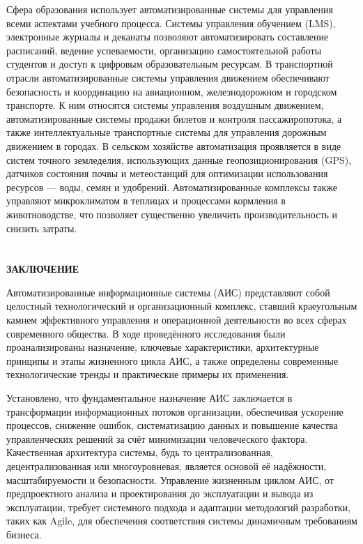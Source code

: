 \documentclass{SibFU-docs}
\begin{document}
Сфера образования использует автоматизированные системы для управления всеми аспектами учебного процесса. Системы управления обучением (LMS), электронные журналы и деканаты позволяют автоматизировать составление расписаний, ведение успеваемости, организацию самостоятельной работы студентов и доступ к цифровым образовательным ресурсам. В транспортной отрасли автоматизированные системы управления движением обеспечивают безопасность и координацию на авиационном, железнодорожном и городском транспорте. К ним относятся системы управления воздушным движением, автоматизированные системы продажи билетов и контроля пассажиропотока, а также интеллектуальные транспортные системы для управления дорожным движением в городах. В сельском хозяйстве автоматизация проявляется в виде систем точного земледелия, использующих данные геопозиционирования (GPS), датчиков состояния почвы и метеостанций для оптимизации использования ресурсов — воды, семян и удобрений. Автоматизированные комплексы также управляют микроклиматом в теплицах и процессами кормления в животноводстве, что позволяет существенно увеличить производительность и снизить затраты.

\newpage
\section*{}
\vspace*{-2.5em}
\begin{center}\textbf{ЗАКЛЮЧЕНИЕ}\end{center}
{}

Автоматизированные информационные системы (АИС) представляют собой целостный технологический и организационный комплекс, ставший краеугольным камнем эффективного управления и операционной деятельности во всех сферах современного общества. В ходе проведённого исследования были проанализированы назначение, ключевые характеристики, архитектурные принципы и этапы жизненного цикла АИС, а также определены современные технологические тренды и практические примеры их применения.

Установлено, что фундаментальное назначение АИС заключается в трансформации информационных потоков организации, обеспечивая ускорение процессов, снижение ошибок, систематизацию данных и повышение качества управленческих решений за счёт минимизации человеческого фактора. Качественная архитектура системы, будь то централизованная, децентрализованная или многоуровневая, является основой её надёжности, масштабируемости и безопасности. Управление жизненным циклом АИС, от предпроектного анализа и проектирования до эксплуатации и вывода из эксплуатации, требует системного подхода и адаптации методологий разработки, таких как Agile, для обеспечения соответствия системы динамичным требованиям бизнеса.
\end{document}

